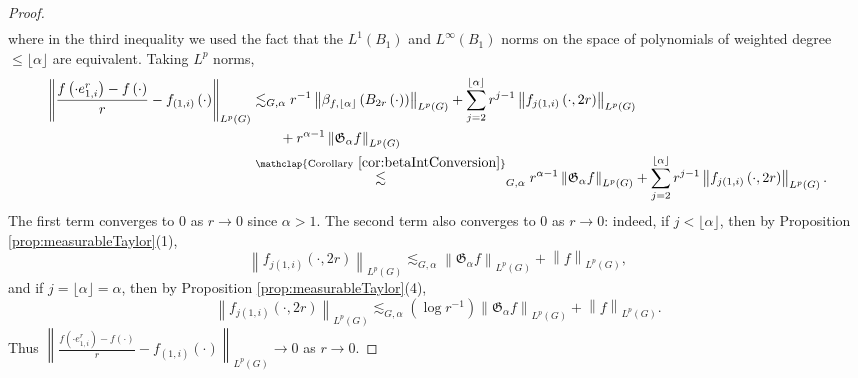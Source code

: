 \documentclass[11pt,reqno]{amsart}
\newcommand{\1}{\mathbf 1}
\begin{document}
\begin{proof}
\begin{align*}
\end{align*}
where in the third inequality we used the fact that the $L^1\left(B_1\right)$ and $L^\infty\left(B_1\right)$ norms on the space of polynomials of weighted degree $\le \lfloor\alpha\rfloor$ are equivalent. Taking $L^p$ norms,
\begin{align*}
\left\|\frac{f\left(\cdot e_{1,i}^r\right)-f\left(\cdot\right)}{r}-f_{\left(1,i\right)}\left(\cdot\right)\right\|_{L^p\left(G\right)} &\lesssim_{G,\alpha} r^{-1}\left\|\beta_{f,\lfloor\alpha\rfloor}\left(B_{2r}\left(\cdot\right)\right)\right\|_{L^p\left(G\right)}+\sum_{j=2}^{\lfloor\alpha\rfloor}r^{j-1}\left\|f_{j\left(1,i\right)}\left(\cdot,2r\right)\right\|_{L^p\left(G\right)}\\
&\qquad+r^{\alpha-1}\left\|\mathfrak{G}_\alpha f\right\|_{L^p\left(G\right)}\\
&\stackrel{\mathclap{\mathrm{Corollary~}\ref{cor:betaIntConversion}}}{\lesssim}_{G,\alpha} r^{\alpha-1}\left\|\mathfrak{G}_\alpha f\right\|_{L^p\left(G\right)}+\sum_{j=2}^{\lfloor\alpha\rfloor}r^{j-1}\left\|f_{j\left(1,i\right)}\left(\cdot,2r\right)\right\|_{L^p\left(G\right)}.
\end{align*}
The first term converges to $0$ as $r\to 0$ since $\alpha>1$. The second term also converges to $0$ as $r\to 0$: indeed, if $j<\lfloor \alpha \rfloor$, then by Proposition \ref{prop:measurableTaylor}(1), 
\[
\left\|f_{j\left(1,i\right)}\left(\cdot,2r\right)\right\|_{L^p\left(G\right)}\lesssim_{G,\alpha} \left\|\mathfrak{G}_\alpha f\right\|_{L^p\left(G\right)}+\left\|f\right\|_{L^p\left(G\right)},
\]
and if $j=\lfloor\alpha\rfloor=\alpha$, then by Proposition \ref{prop:measurableTaylor}(4), 
\[
\left\|f_{j\left(1,i\right)}\left(\cdot,2r\right)\right\|_{L^p\left(G\right)}\lesssim_{G,\alpha} \left(\log r^{-1}\right)\left\|\mathfrak{G}_\alpha f\right\|_{L^p\left(G\right)}+\left\|f\right\|_{L^p\left(G\right)}.
\]
Thus $\left\|\frac{f\left(\cdot e_{1,i}^r\right)-f\left(\cdot\right)}{r}-f_{\left(1,i\right)}\left(\cdot\right)\right\|_{L^p\left(G\right)}\to 0$ as $r\to 0$.
\end{proof}
\end{document}
